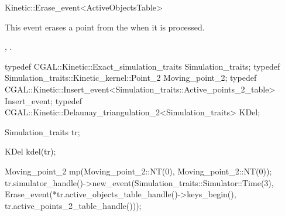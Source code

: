 

\begin{ccRefClass}{Kinetic::Erase_event<ActiveObjectsTable>}  %


\ccDefinition
  
This event erases a point from the  when it
is processed.


\ccIsModel
{}

\ccCreation
{}  %



\ccSeeAlso

,
.

\ccExample

\begin{ccExampleCode}
typedef CGAL::Kinetic::Exact_simulation_traits Simulation_traits;
typedef Simulation_traits::Kinetic_kernel::Point_2 Moving_point_2;
typedef CGAL::Kinetic::Insert_event<Simulation_traits::Active_points_2_table> Insert_event;
typedef CGAL::Kinetic::Delaunay_triangulation_2<Simulation_traits> KDel;

Simulation_traits tr;

KDel kdel(tr);

Moving_point_2 mp(Moving_point_2::NT(0),
                  Moving_point_2::NT(0));
tr.simulator_handle()->new_event(Simulation_traits::Simulator::Time(3), 
                                 Erase_event(*tr.active_objects_table_handle()->keys_begin(),
			                      tr.active_points_2_table_handle()));

\end{ccExampleCode}




\end{ccRefClass}


